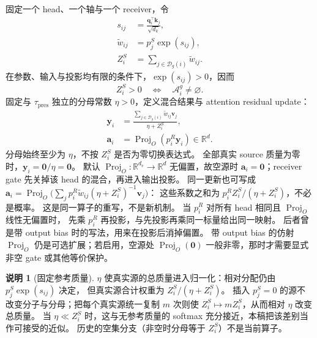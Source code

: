 \documentclass[11pt,UTF8,fontset=fandol]{ctexart}
\numberwithin{equation}{section}
\theoremstyle{definition}
\newtheorem{remark}[definition]{说明}
\newcommand{\Dset}{\mathcal D}
\newcommand{\R}{\mathbb R}
\begin{document}
固定一个 head、一个轴与一个 receiver，令
\begin{equation}
 \begin{aligned}
  s_{ij}&=\frac{\bm q_i^\top\bm k_j}{\sqrt{d_k}},\\
  \widetilde w_{ij}&=p_j^S\exp(s_{ij}),\\
  Z_i^S&=\sum_{j\in\Dset_g(i)}\widetilde w_{ij}.
 \end{aligned}
 \label{eq:A:attention-mass}
\end{equation}
在参数、输入与投影均有限的条件下，$\exp(s_{ij})>0$，因而
\begin{equation}
  Z_i^S>0\quad\Longleftrightarrow\quad\mathcal A_i^g\ne\varnothing.
  \label{eq:A:mass-nonempty}
\end{equation}
固定与 $\tau_{\mathrm{pres}}$ 独立的分母常数 $\eta>0$，定义混合结果与 attention residual update：
\begin{equation}
 \begin{aligned}
  \bm y_i
    &=\frac{\sum_{j\in\Dset_g(i)}\widetilde w_{ij}\bm v_j}{\eta+Z_i^S},\\
  \bm a_i
    &=\operatorname{Proj}_O(p_i^R\bm y_i)\in\R^d.
 \end{aligned}
 \label{eq:A:oattention-single}
\end{equation}
\label{eq:oattention}
分母始终至少为 $\eta$，不按 $Z_i^S$ 是否为零切换表达式。
全部真实 source 质量为零时，$\bm y_i=\bm0/\eta=\bm0$。
默认 $\operatorname{Proj}_O:\R^{d_v}\to\R^d$ 无偏置，故空源时
$\bm a_i=\bm0$；receiver gate 先关掉该 head 的混合，再进入输出投影。
同一更新也可写成
$\bm a_i=\operatorname{Proj}_O\bigl(\sum_j
p_i^R\widetilde w_{ij}(\eta+Z_i^S)^{-1}\bm v_j\bigr)$：
这些系数之和为 $p_i^R Z_i^S/(\eta+Z_i^S)$，不必是概率。
这是同一算子的重写，不是新机制。
当 $p_i^R$ 对所有 head 相同且 $\operatorname{Proj}_O$ 线性无偏置时，
先乘 $p_i^R$ 再投影，与先投影再乘同一标量给出同一映射。
后者曾是带 output bias 时的写法，用来在投影后消掉偏置。
带 output bias 的仿射 $\operatorname{Proj}_O$ 仍是可选扩展；若启用，空源处
$\operatorname{Proj}_O(\bm0)$ 一般非零，那时才需要显式非空 gate 或其他等价保护。

\begin{remark}[固定参考质量]
$\eta$ 使真实源的总质量进入归一化：相对分配仍由 $p_j^S\exp(s_{ij})$ 决定，
但真实源合计权重为 $Z_i^S/(\eta+Z_i^S)$。
插入 $p_j^S=0$ 的源不改变分子与分母；把每个真实源统一复制 $m$ 次则使
$Z_i^S\mapsto mZ_i^S$，从而相对 $\eta$ 改变总质量。
当 $\eta\ll Z_i^S$ 时，这与无参考质量的 softmax 充分接近，本稿把该差别当作可接受的近似。
历史的空集分支（非空时分母等于 $Z_i^S$）不是当前算子。
\end{remark}
\end{document}
